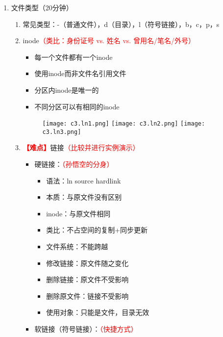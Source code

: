 \documentclass{TIJMUjiaoanLL}
\begin{document}
\begin{enumerate}
  \item 文件类型（20分钟）
    \begin{enumerate}
      \item 常见类型：-（普通文件），d（目录），l（符号链接），b，c，p，s
      \item inode\textcolor{red}{（类比：身份证号 vs. 姓名 vs. 曾用名/笔名/外号）}
        \vspace*{-10pt}
        \begin{multicols}{2}
          \begin{itemize}
	    \item 每一个文件都有一个inode
	    \item 使用inode而非文件名引用文件
	    \item 分区内inode是唯一的
	    \item 不同分区可以有相同的inode
	  \end{itemize}
        \end{multicols}
        \vspace*{-20pt}
        \begin{figure}[h]
	  \centering
	  \texttt{[image: c3.ln1.png]}
	  \texttt{[image: c3.ln2.png]}
	  \texttt{[image: c3.ln3.png]}
	\end{figure}
        \vspace*{-15pt}
      \item \textcolor{red}{\textbf{【难点】}}链接\textcolor{red}{（比较并进行实例演示）}
        \vspace*{-10pt}
        \begin{multicols}{2}
 	  \begin{itemize}
      \item 硬链接：\textcolor{red}{（孙悟空的分身）}
	      \begin{itemize}
                \item 语法：ln source hardlink
		\item 本质：与原文件没有区别
		\item inode：与原文件相同
		\item 类比：不占空间的复制+同步更新
		\item 文件系统：不能跨越
		\item 修改链接：原文件随之变化
		\item 删除链接：原文件不受影响
		\item 删除原文件：链接不受影响
		\item 使用对象：只能是文件，目录无效
	      \end{itemize}
      \item 软链接（符号链接）：\textcolor{red}{（快捷方式）}

\end{itemize}
\end{multicols}
\end{enumerate}
\end{enumerate}
\end{document}
